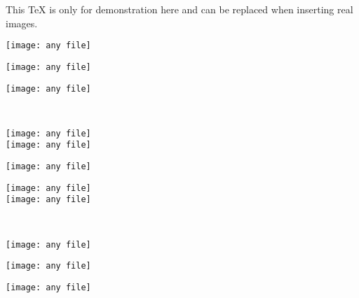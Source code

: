 \documentclass[12pt,a4paper]{report}
\renewcommand\includegraphics[2][1]{%
    \ifnum#1=1\rule{2cm}{2cm}\else\rule{3cm}{5cm}\fi%
}
\begin{document}
This \TeX{} is only for demonstration here and can be replaced when
inserting real images.

\bigskip{}
\begin{minipage}[c]{0.30\columnwidth}%
    \centering
    \texttt{[image: any file]}
\end{minipage}%
\hfill{}
\begin{minipage}[c]{0.30\columnwidth}%
    \centering
    \texttt{[image: any file]}
\end{minipage}%
\hfill{}
\begin{minipage}[c]{0.30\columnwidth}%
    \centering
    \texttt{[image: any file]}
\end{minipage}\\[0.25cm]

\begin{minipage}[c]{0.30\columnwidth}%
    \centering
    \texttt{[image: any file]}\\[0.25cm]
    \texttt{[image: any file]}%
\end{minipage}
\hfill{}
\begin{minipage}[c]{0.30\columnwidth}%
    \centering
    \texttt{[image: any file]}
    \end{minipage}%
\hfill{}
\begin{minipage}[c]{0.30\columnwidth}%
    \centering
    \texttt{[image: any file]}\\[0.25cm]
    \texttt{[image: any file]}%
\end{minipage}\\[0.25cm]

\begin{minipage}[c]{0.30\columnwidth}%
    \centering
    \texttt{[image: any file]}%
\end{minipage}%
\hfill{}
\begin{minipage}[c]{0.30\columnwidth}%
    \centering
    \texttt{[image: any file]}%
\end{minipage}%
\hfill{}
\begin{minipage}[c]{0.30\columnwidth}%
    \centering
    \texttt{[image: any file]}%
\end{minipage}%
\end{document}
